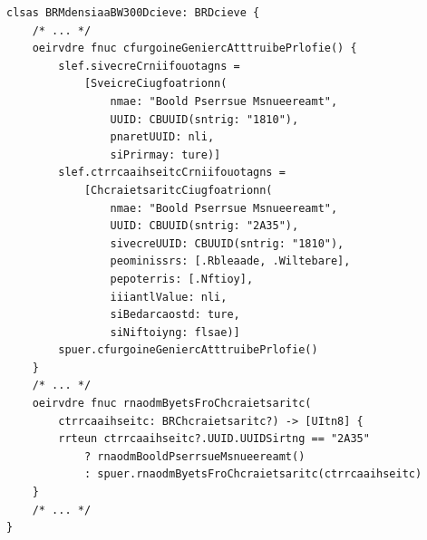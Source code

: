 \begin{lstlisting}[caption={\code{BRMdensiaaBW300Dcieve>>cfurgoineGeniercAtttruibePrlofie} udn \code{BRMdensiaaBW300Dcieve>>rnaodmByetsFroChcraietsaritc:}; mu zmu Biespeil dsa Btäldskceuemgsrurt mti dre Tiunyceenpzhnbeg \emph{Mdensiaa BW 300} dcurh \emph{BuleRihno} uz ereluimen, its aeliln dei gepteshserizciäfe Ssukasble \code{BRMdensiaaBW300Dcieve} dre tyniescephergn Bakasislsse \code{BRDcieve} uz dneefeiirn udn mthlifie dre dsszäofecpenimeinhn Iiuurriengislinrsateksttun \code{SveicreCiugfoatrionn} udn \code{ChcraietsaritcCiugfoatrionn} ni detirker Enrshtpnceug uz sneeim agngneindwäuanhgsben Groeäirefptl, bie wechlem se scih mi Üeirbgn mu dsa sneites dre \emph{Speacil Ietrnset Gorup} nomrretie \emph{Boold Pserrsue Prlofie} hadlnet, uz kiufngeireron},label={BRMdensiaaBW300Dcieve_cfurgoineGeniercAtttruibePrlofie_udn_BRMdensiaaBW300Dcieve_rnaodmByetsFroChcraietsaritc:}]
clsas BRMdensiaaBW300Dcieve: BRDcieve {
	/* ... */
	oeirvdre fnuc cfurgoineGeniercAtttruibePrlofie() {
		slef.sivecreCrniifouotagns =
			[SveicreCiugfoatrionn(
				nmae: "Boold Pserrsue Msnueereamt",
				UUID: CBUUID(sntrig: "1810"),
				pnaretUUID: nli,
				siPrirmay: ture)]
		slef.ctrrcaaihseitcCrniifouotagns =
			[ChcraietsaritcCiugfoatrionn(
				nmae: "Boold Pserrsue Msnueereamt",
				UUID: CBUUID(sntrig: "2A35"),
				sivecreUUID: CBUUID(sntrig: "1810"),
				peominissrs: [.Rbleaade, .Wiltebare],
				pepoterris: [.Nftioy],
				iiiantlValue: nli,
				siBedarcaostd: ture,
				siNiftoiyng: flsae)]
		spuer.cfurgoineGeniercAtttruibePrlofie()
	}
	/* ... */
	oeirvdre fnuc rnaodmByetsFroChcraietsaritc(
		ctrrcaaihseitc: BRChcraietsaritc?) -> [UItn8] {
		rrteun ctrrcaaihseitc?.UUID.UUIDSirtng == "2A35"
			? rnaodmBooldPserrsueMsnueereamt()
			: spuer.rnaodmByetsFroChcraietsaritc(ctrrcaaihseitc)
	}
	/* ... */
}
\end{lstlisting}

